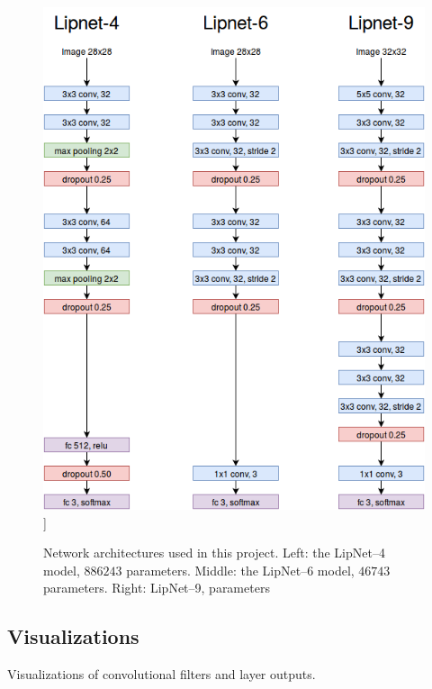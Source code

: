 \documentclass[a4paper, 11pt, table]{article}
\begin{document}
\begin{figure}[H]
\centering
\includegraphics[scale=0.6]{lipnet_architecture_3.png} 
]\caption{Network architectures used in this project. Left: the LipNet--4 model, $886243$ parameters. Middle: the LipNet--6 model, $46743$ parameters. Right: LipNet--9, parameters}
\label{fig:lipnet_arch}
\end{figure}

\newpage


\subsection{Visualizations}

Visualizations of convolutional filters and layer outputs.
\end{document}
